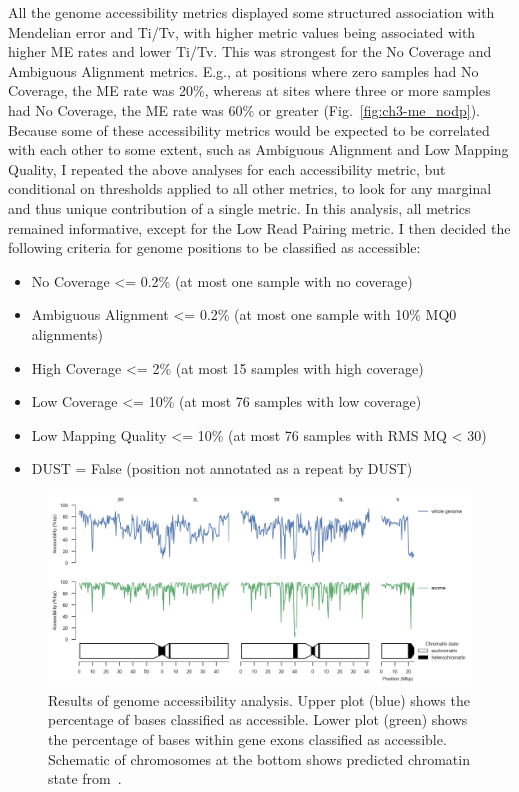 \begin{refsection}
All the genome accessibility metrics displayed some structured association with Mendelian error and Ti/Tv, with higher metric values being associated with higher ME rates and lower Ti/Tv.
%
This was strongest for the No Coverage and Ambiguous Alignment metrics.
%
E.g., at positions where zero samples had No Coverage, the ME rate was 20\%, whereas at sites where three or more samples had No Coverage, the ME rate was 60\% or greater (Fig.~\ref{fig:ch3-me_nodp}).
%
Because some of these accessibility metrics would be expected to be correlated with each other to some extent, such as Ambiguous Alignment and Low Mapping Quality, I repeated the above analyses for each accessibility metric, but conditional on thresholds applied to all other metrics, to look for any marginal and thus unique contribution of a single metric.
%
In this analysis, all metrics remained informative, except for the Low Read Pairing metric.
%
I then decided the following criteria for genome positions to be classified as accessible:
%
\begin{itemize}
\item No Coverage <= 0.2\% (at most one sample with no coverage)
\item Ambiguous Alignment <= 0.2\% (at most one sample with 10\% MQ0 alignments)
\item High Coverage <= 2\% (at most 15 samples with high coverage)
\item Low Coverage <= 10\% (at most 76 samples with low coverage)
\item Low Mapping Quality <= 10\% (at most 76 samples with RMS MQ < 30)
\item DUST = False (position not annotated as a repeat by DUST)
\end{itemize}


\begin{figure}[t!]
\centering
\includegraphics[width=\textwidth]{artwork/chapter3/accessibility.jpeg}
\caption{Results of genome accessibility analysis.
%
Upper plot (blue) shows the percentage of bases classified as accessible.
%
Lower plot (green) shows the percentage of bases within gene exons classified as accessible.
%
Schematic of chromosomes at the bottom shows predicted chromatin state from~\textcite{Sharakhova2010}.
%
}
%
\label{fig:ch3-accessibility}
\end{figure}



\end{refsection}
